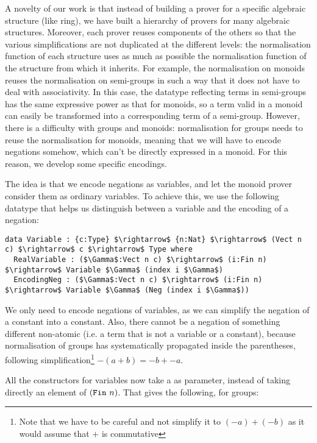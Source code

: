 A novelty of our work is that instead of building a prover for a
specific algebraic structure (like ring), we have built a hierarchy of provers
for many algebraic structures. Moreover, each prover reuses components
of the others so that
the various simplifications are not duplicated at the different
levels: the normalisation function of each structure uses as much as possible
the normalisation function of the structure from which it inherits. For
example, the normalisation on monoids reuses the normalisation on semi-groups
in such a way that it does not have to deal with associativity. In this
case, the datatype reflecting terms in semi-groups has
the same expressive power as that for monoids, so a term valid in a monoid can easily be transformed into a corresponding term of a semi-group. However, 
there is a difficulty with
groups and monoids: normalisation for groups
needs to reuse the normalisation for monoids, meaning that
we will have to encode 
negations somehow, which can't be directly expressed in a monoid. For this
reason, we develop some specific encodings.

The idea is that we encode negations as variables, and let the
monoid prover consider them as ordinary variables. To achieve this,
we use the following datatype that helps us distinguish between a
variable and the encoding of a negation:

\begin{lstlisting}
data Variable : {c:Type} $\rightarrow$ {n:Nat} $\rightarrow$ (Vect n c) $\rightarrow$ c $\rightarrow$ Type where
  RealVariable : ($\Gamma$:Vect n c) $\rightarrow$ (i:Fin n) $\rightarrow$ Variable $\Gamma$ (index i $\Gamma$)
  EncodingNeg : ($\Gamma$:Vect n c) $\rightarrow$ (i:Fin n) $\rightarrow$ Variable $\Gamma$ (Neg (index i $\Gamma$))
\end{lstlisting}

We only need to encode negations of variables, as we can simplify 
the negation of a constant into a constant.
Also, there cannot be a negation of something
different non-atomic (i.e. a term that is not a variable or a constant), because normalisation 
of
groups has systematically propagated  inside the parentheses,
following simplification\footnote{Note that we have to be careful and not
simplify it to $(-a) + (-b)$ as it would assume that $+$ is commutative}
$-(a+b) = -b + -a$.

All the constructors for variables now take a  as parameter,
instead of taking directly an element of $(\code{Fin}\ n)$. That gives the
following, for groups:

